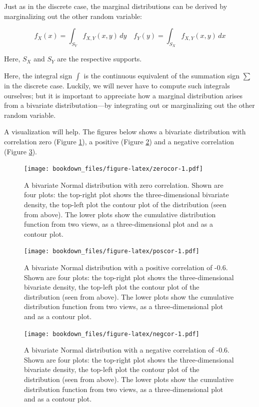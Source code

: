 \documentclass[12pt,]{krantz}
\theoremstyle{definition}
\theoremstyle{definition}
\theoremstyle{definition}
\theoremstyle{remark}
\begin{document}
Just as in the discrete case, the marginal distributions can be derived by marginalizing out the other random variable:

\begin{equation}
f_X(x) = \int_{S_Y} f_{X,Y}(x,y)\, dy \quad f_Y(y) = \int_{S_X} f_{X,Y}(x,y)\, dx
\end{equation}

Here, \(S_X\) and \(S_Y\) are the respective supports.

Here, the integral sign \(\int\) is the continuous equivalent of the summation sign \(\sum\) in the discrete case. Luckily, we will never have to compute such integrals ourselves; but it is important to appreciate how a marginal distribution arises from a bivariate distributation---by integrating out or marginalizing out the other random variable.

A visualization will help. The figures below shows a bivariate distribution with correlation zero (Figure \ref{fig:zerocor}), a positive (Figure \ref{fig:poscor}) and a negative correlation (Figure \ref{fig:negcor}).

\begin{figure}
\centering
\texttt{[image: bookdown\_files/figure-latex/zerocor-1.pdf]}
\caption{\label{fig:zerocor}A bivariate Normal distribution with zero correlation. Shown are four plots: the top-right plot shows the three-dimensional bivariate density, the top-left plot the contour plot of the distribution (seen from above). The lower plots show the cumulative distribution function from two views, as a three-dimensional plot and as a contour plot.}
\end{figure}

\begin{figure}
\centering
\texttt{[image: bookdown\_files/figure-latex/poscor-1.pdf]}
\caption{\label{fig:poscor}A bivariate Normal distribution with a positive correlation of -0.6. Shown are four plots: the top-right plot shows the three-dimensional bivariate density, the top-left plot the contour plot of the distribution (seen from above). The lower plots show the cumulative distribution function from two views, as a three-dimensional plot and as a contour plot.}
\end{figure}

\begin{figure}
\centering
\texttt{[image: bookdown\_files/figure-latex/negcor-1.pdf]}
\caption{\label{fig:negcor}A bivariate Normal distribution with a negative correlation of -0.6. Shown are four plots: the top-right plot shows the three-dimensional bivariate density, the top-left plot the contour plot of the distribution (seen from above). The lower plots show the cumulative distribution function from two views, as a three-dimensional plot and as a contour plot.}
\end{figure}
\end{document}
